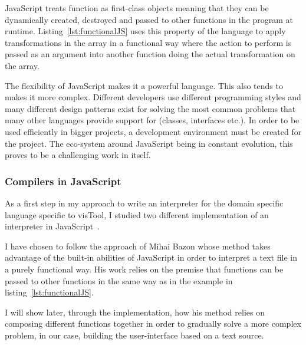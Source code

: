 JavaScript treats function as first-class objects meaning that they can be dynamically created, destroyed and passed to other functions in the program at runtime. Listing~\ref{lst:functionalJS} uses this property of the language to apply transformations in the array in a functional way where the action to perform is passed as an argument into another function doing the actual transformation on the array.

The flexibility of JavaScript makes it a powerful language. This also tends to makes it more complex. Different developers use different programming styles and many different design patterns exist for solving the most common problems that many other languages provide support for (classes, interfaces etc.). In order to be used efficiently in bigger projects, a development environment must be created for the project. The eco-system around JavaScript being in constant evolution, this proves to be a challenging work in itself.

\subsubsection{Compilers in JavaScript}

As a first step in my approach to write an interpreter for the domain specific language specific to visTool, I studied two different implementation of an interpreter in JavaScript~\cite{crockford2007}\cite{bazon16}.

I have chosen to follow the approach of Mihai Bazon whose method takes advantage of the built-in abilities of JavaScript in order to interpret a text file in a purely functional way. His work relies on the premise that functions can be passed to other functions in the same way as in the example in listing~\ref{lst:functionalJS}.

I will show later, through the implementation, how his method relies on composing different functions together in order to gradually solve a more complex problem, in our case, building the user-interface based on a text source.